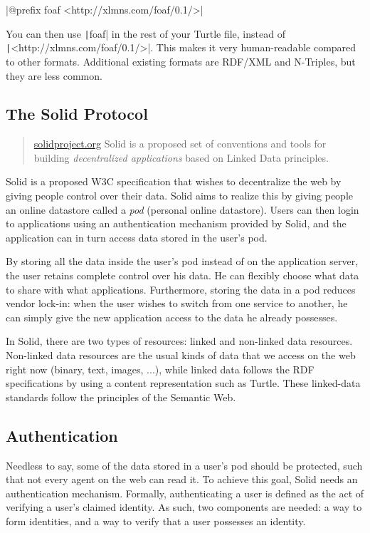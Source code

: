 |@prefix foaf <http://xlmns.com/foaf/0.1/>|

\noindent You can then use \texttt|foaf| in the rest of your Turtle file, instead of\\ \texttt|<http://xlmns.com/foaf/0.1/>|. This makes it very human-readable compared to other formats. Additional existing formats are \gls{RDF}/XML and N-Triples, but they are less common.

\subsection{The Solid Protocol}
\begin{quote}{\href{https://solidproject.org}{solidproject.org}}
    Solid is a proposed set of conventions and tools for building \textit{decentralized applications} based on Linked Data principles.
\end{quote}

\noindent Solid \citep{solid} is a proposed W3C specification that wishes to decentralize the web by giving people control over their data. Solid aims to realize this by giving people an online datastore called a \textit{pod} (personal online datastore). Users can then login to applications using an authentication mechanism provided by Solid, and the application can in turn access data stored in the user's pod.

By storing all the data inside the user's pod instead of on the application server, the user retains complete control over his data. He can flexibly choose what data to share with what applications. Furthermore, storing the data in a pod reduces vendor lock-in: when the user wishes to switch from one service to another, he can simply give the new application access to the data he already possesses. 

In Solid, there are two types of resources: linked and non-linked data resources. Non-linked data resources are the usual kinds of data that we access on the web right now (binary, text, images, ...), while linked data follows the 
 \gls{RDF} specifications by using a content representation such as Turtle. These linked-data standards follow the principles of the Semantic Web.

\subsection{Authentication}
Needless to say, some of the data stored in a user's pod should be protected, such that not every agent on the web can read it. To achieve this goal, Solid needs an authentication mechanism. Formally, authenticating a user is defined as the act of verifying a user's claimed identity. As such, two components are needed: a way to form identities, and a way to verify that a user possesses an identity.

